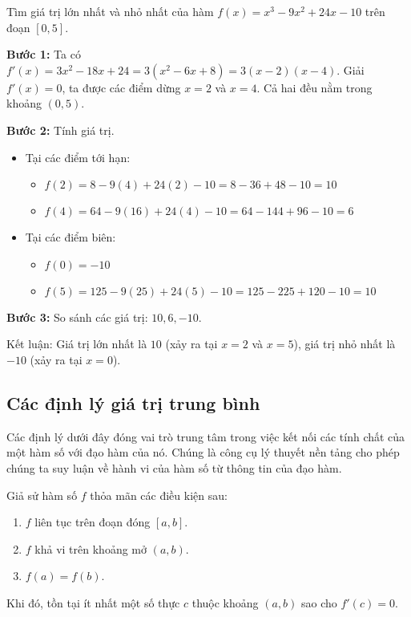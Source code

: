 \begin{example}\label{ex:find-global-extrema-2}
Tìm giá trị lớn nhất và nhỏ nhất của hàm $f(x) = x^3 - 9x^2 + 24x - 10$ trên đoạn $[0, 5]$.

\textbf{Bước 1:} Ta có $f'(x) = 3x^2 - 18x + 24 = 3(x^2 - 6x + 8) = 3(x-2)(x-4)$.
Giải $f'(x)=0$, ta được các điểm dừng $x=2$ và $x=4$. Cả hai đều nằm trong khoảng $(0,5)$.

\textbf{Bước 2:} Tính giá trị.
\begin{itemize}
    \item Tại các điểm tới hạn:
        \begin{itemize}
            \item $f(2) = 8 - 9(4) + 24(2) - 10 = 8 - 36 + 48 - 10 = 10$
            \item $f(4) = 64 - 9(16) + 24(4) - 10 = 64 - 144 + 96 - 10 = 6$
        \end{itemize}
    \item Tại các điểm biên:
        \begin{itemize}
            \item $f(0) = -10$
            \item $f(5) = 125 - 9(25) + 24(5) - 10 = 125 - 225 + 120 - 10 = 10$
        \end{itemize}
\end{itemize}
\textbf{Bước 3:} So sánh các giá trị: $10, 6, -10$.

Kết luận: Giá trị lớn nhất là $10$ (xảy ra tại $x=2$ và $x=5$), giá trị nhỏ nhất là $-10$ (xảy ra tại $x=0$).
\end{example}

\subsection{Các định lý giá trị trung bình}
\label{sec:mean-value-theorems}

Các định lý dưới đây đóng vai trò trung tâm trong việc kết nối các tính chất của một hàm số với đạo hàm của nó. Chúng là công cụ lý thuyết nền tảng cho phép chúng ta suy luận về hành vi của hàm số từ thông tin của đạo hàm.

\begin{theorem}\label{thm:rolle}
Giả sử hàm số $f$ thỏa mãn các điều kiện sau:
\begin{enumerate}[label=(\roman*)]
    \item $f$ liên tục trên đoạn đóng $[a, b]$.
    \item $f$ khả vi trên khoảng mở $(a, b)$.
    \item $f(a) = f(b)$.
\end{enumerate}
Khi đó, tồn tại ít nhất một số thực $c$ thuộc khoảng $(a, b)$ sao cho $f'(c) = 0$.
\end{theorem}


